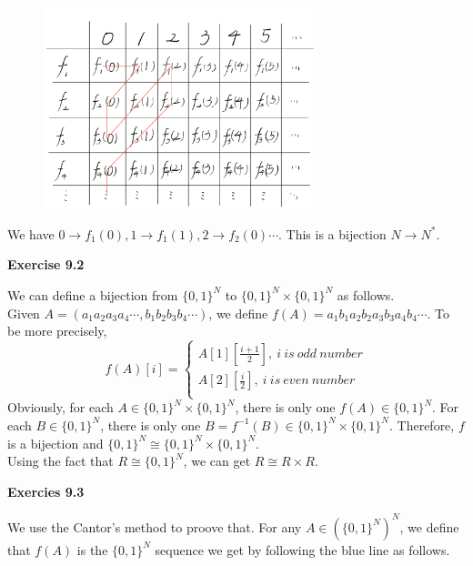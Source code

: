 \documentclass{article} %
\begin{document}
    \begin{figure}[H]
  	\centering
  	\includegraphics[width=8cm]{9_1_3.png}
  	\caption{}
  	\label{}
  	\end{figure}
    We have $0\rightarrow f_1\left(0\right),1\rightarrow f_1\left(1\right),2\rightarrow f_2\left(0\right)\cdots$. This is a bijection $N\rightarrow N^*$.


\textbf{Exercise 9.2}\par
We can define a bijection from $\{0,1\}^N$ to $\{0,1\}^N\times \{0,1\}^N$ as follows.\\
Given $A=(a_1a_2a_3a_4\cdots,b_1b_2b_3b_4\cdots)$, we define $f(A)=a_1b_1a_2b_2a_3b_3a_4b_4\cdots$. To be more precisely, 
$$ f(A)[i]=\left\{
\begin{aligned}
A[1][\frac{i+1}{2}],\ i\ is\ odd\ number \\
A[2][\frac{i}{2}],\ i\ is\ even\ number \\
\end{aligned}
\right.
$$
Obviously, for each $A\in \{0,1\}^N\times \{0,1\}^N$, there is only one $f(A)\in \{0,1\}^N$. For each $B\in \{0,1\}^N$, there is only one $B=f^{-1}(B)\in \{0,1\}^N\times \{0,1\}^N$. Therefore, $f$ is a bijection and $\{0,1\}^N\cong \{0,1\}^N\times\{0,1\}^N$.\\
Using the fact that $R\cong \{0,1\}^N$, we can get $R\cong R\times R$.

\textbf{Exercies 9.3}\par
We use the Cantor's method to proove that. For any $A\in (\{0,1\}^N)^N$, we define that $f(A)$ is the $\{0,1\}^N$ sequence we get by following the blue line as follows.
 
\end{document}
